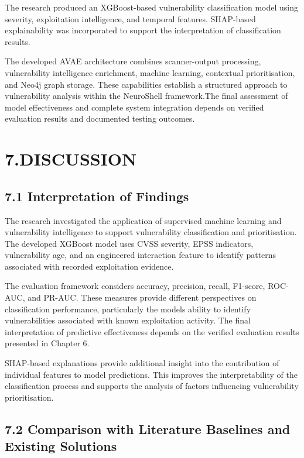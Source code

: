 \documentclass[
]{article}
\begin{document}
The research produced an XGBoost-based vulnerability classification
model using severity, exploitation intelligence, and temporal features.
SHAP-based explainability was incorporated to support the interpretation
of classification results.

The developed AVAE architecture combines scanner-output processing,
vulnerability intelligence enrichment, machine learning, contextual
prioritisation, and Neo4j graph storage. These capabilities establish a
structured approach to vulnerability analysis within the NeuroShell
framework.The final assessment of model effectiveness and complete
system integration depends on verified evaluation results and documented
testing outcomes.

\hypertarget{discussion}{%
\section{7.DISCUSSION}\label{discussion}}

\hypertarget{interpretation-of-findings}{%
\subsection{7.1 Interpretation of
Findings}\label{interpretation-of-findings}}

The research investigated the application of supervised machine learning
and vulnerability intelligence to support vulnerability classification
and prioritisation. The developed XGBoost model uses CVSS severity, EPSS
indicators, vulnerability age, and an engineered interaction feature to
identify patterns associated with recorded exploitation evidence.

The evaluation framework considers accuracy, precision, recall,
F1-score, ROC-AUC, and PR-AUC. These measures provide different
perspectives on classification performance, particularly the
model\textquotesingle s ability to identify vulnerabilities associated
with known exploitation activity. The final interpretation of predictive
effectiveness depends on the verified evaluation results presented in
Chapter 6.

SHAP-based explanations provide additional insight into the contribution
of individual features to model predictions. This improves the
interpretability of the classification process and supports the analysis
of factors influencing vulnerability prioritisation.

\hypertarget{comparison-with-literature-baselines-and-existing-solutions}{%
\subsection{7.2 Comparison with Literature Baselines and Existing
Solutions}\label{comparison-with-literature-baselines-and-existing-solutions}}
\end{document}
